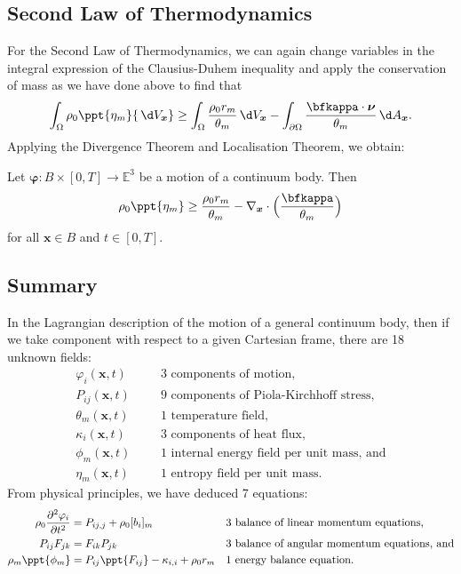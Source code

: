 \documentclass[
  letterpaper,
  DIV=11,
  numbers=noendperiod]{scrreprt}
\theoremstyle{plain}
\theoremstyle{remark}
\begin{document}
\subsection{Second Law of
Thermodynamics}\label{second-law-of-thermodynamics-1}

For the Second Law of Thermodynamics, we can again change variables in
the integral expression of the Clausius-Duhem inequality and apply the
conservation of mass as we have done above to find that
\[\int_\Omega \rho_0\ppt{\eta_m}{\,\d V_{{\boldsymbol{x}}}}\geq \int_{\Omega}\frac{\rho_0r_m}{\theta_m}{\,\d V_{{\boldsymbol{x}}}}-\int_{\partial \Omega} \frac{\bfkappa\cdot{\boldsymbol{\nu}}}{\theta_m}{\,\d A_{{\boldsymbol{x}}}}.\]
Applying the Divergence Theorem and Localisation Theorem, we obtain:

Let \({\boldsymbol{\varphi}}:B\times[0,T]\to{\mathbb{E}}^3\) be a motion
of a continuum body. Then
\[\rho_0\ppt{\eta_m}\geq \frac{\rho_0 r_m}{\theta_m}-\nabla_{\boldsymbol{x}}\cdot\Big(\frac{\bfkappa}{\theta_m}\Big)\]
for all \({\boldsymbol{x}}\in B\) and \(t\in[0,T]\).

\subsection{Summary}\label{summary-1}

In the Lagrangian description of the motion of a general continuum body,
then if we take component with respect to a given Cartesian frame, there
are 18 unknown fields: \[\begin{aligned}
    \varphi_i({\boldsymbol{x}},t) &&&\text{3 components of motion,}\\
    P_{ij}({\boldsymbol{x}},t) &&&\text{9 components of Piola-Kirchhoff stress,}\\
    \theta_m({\boldsymbol{x}},t) &&&\text{1 temperature field,}\\
    \kappa_i({\boldsymbol{x}},t) &&&\text{3 components of heat flux,}\\
    \phi_m({\boldsymbol{x}},t) &&&\text{1 internal energy field per unit mass, and}\\
    \eta_m({\boldsymbol{x}},t) &&&\text{1 entropy field per unit mass.}
  \end{aligned}\] From physical principles, we have deduced 7 equations:
\[\begin{aligned}[]
    \rho_0\frac{\partial ^2\varphi_i}{\partial t^2} &= P_{ij,j}+\rho_0[b_i]_m&& \text{3 balance of linear momentum equations,}\\
    P_{ij}F_{jk} &= F_{ik}P_{jk} && \text{3 balance of angular momentum equations, and}\\
    \rho_m\ppt{\phi_m} &= P_{ij}\ppt{F_{ij}}-\kappa_{i,i}+\rho_0 r_m &&\text{1 energy balance equation.}
  \end{aligned}\]
\end{document}
